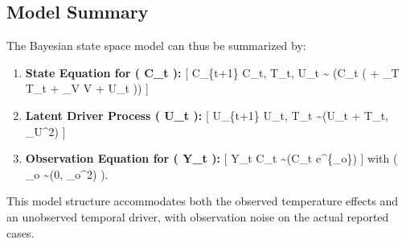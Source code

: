 \documentclass[
  letterpaper,
  DIV=11,
  numbers=noendperiod]{scrartcl}
\begin{document}
\subsection{Model Summary}\label{model-summary}

The Bayesian state space model can thus be summarized by:

\begin{enumerate}
\def\labelenumi{\arabic{enumi}.}
\item
  \textbf{State Equation for ( C\_t ):} {[} C\_\{t+1\} \vert C\_t, T\_t,
  U\_t \sim {} \left(C\_t \exp \left( \alpha + \beta\_T T\_t
  + \beta\_V V + \gamma U\_t \right)\right) {]}
\item
  \textbf{Latent Driver Process ( U\_t ):} {[} U\_\{t+1\} \vert U\_t,
  T\_t \sim {}(\phi U\_t + \eta T\_t, \sigma\_U\^{}2) {]}
\item
  \textbf{Observation Equation for ( Y\_t ):} {[} Y\_t \vert C\_t
  \sim {}(C\_t e\^{}\{\epsilon\_o\}) {]} with ( \epsilon\_o
  \sim {}(0, \sigma\_o\^{}2) ).
\end{enumerate}

This model structure accommodates both the observed temperature effects
and an unobserved temporal driver, with observation noise on the actual
reported cases.
\end{document}

